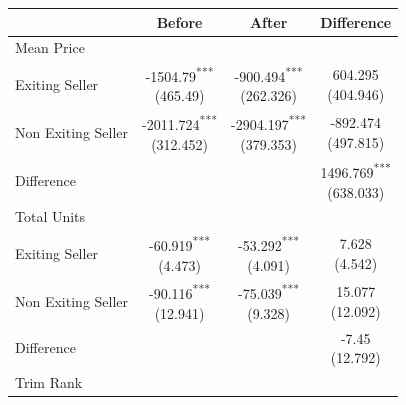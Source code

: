 \begin{tabular}{l|ccc}
\toprule
 & Before & After & Difference \\
\midrule
Mean Price \\
\midrule
Exiting Seller & \makecell{-1504.79\textsuperscript{***} \\ (465.49)\\[0.25em]} & \makecell{-900.494\textsuperscript{***} \\ (262.326)\\[0.25em]} & \makecell{604.295 \\ (404.946)\\[0.25em]} \\
Non Exiting Seller & \makecell{-2011.724\textsuperscript{***} \\ (312.452)\\[0.25em]} & \makecell{-2904.197\textsuperscript{***} \\ (379.353)\\[0.25em]} & \makecell{-892.474 \\ (497.815)\\[0.25em]} \\
Difference &  &  & \makecell{1496.769\textsuperscript{***} \\ (638.033)\\[0.25em]} \\
\midrule
Total Units \\
\midrule
Exiting Seller & \makecell{-60.919\textsuperscript{***} \\ (4.473)\\[0.25em]} & \makecell{-53.292\textsuperscript{***} \\ (4.091)\\[0.25em]} & \makecell{7.628 \\ (4.542)\\[0.25em]} \\
Non Exiting Seller & \makecell{-90.116\textsuperscript{***} \\ (12.941)\\[0.25em]} & \makecell{-75.039\textsuperscript{***} \\ (9.328)\\[0.25em]} & \makecell{15.077 \\ (12.092)\\[0.25em]} \\
Difference &  &  & \makecell{-7.45 \\ (12.792)\\[0.25em]} \\
\midrule
Trim Rank \\

\end{tabular}
